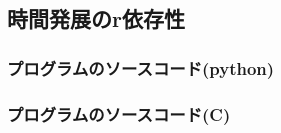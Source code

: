 \documentclass[a4paper,11pt,titlepage]{jarticle}
\begin{document}
\subsection{時間発展のr依存性}
\subsubsection{プログラムのソースコード(python)}




\subsubsection{プログラムのソースコード(C)}

             
      
      
\clearpage
\end{document}
